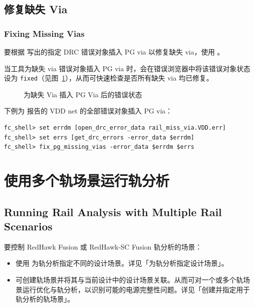 \subsection{修复缺失 Via}
\subsubsection*{Fixing Missing Vias}

要根据  写出的指定 DRC 错误对象插入 PG via 以修复缺失 via，使用 。

当工具为缺失 via 错误对象插入 PG via 时，会在错误浏览器中将该错误对象状态设为 \texttt{fixed}（见图~\ref{fig:fix-via-status}），从而可快速检查是否所有缺失 via 均已修复。

\begin{figure}[htbp]
\centering
{}
\caption{为缺失 Via 插入 PG Via 后的错误状态}
\label{fig:fix-via-status}
\end{figure}

下例为   报告的 VDD net 的全部错误对象插入 PG via：
\begin{lstlisting}
fc_shell> set errdm [open_drc_error_data rail_miss_via.VDD.err]
fc_shell> set errs [get_drc_errors -error_data $errdm]
fc_shell> fix_pg_missing_vias -error_data $errdm $errs
\end{lstlisting}

\section{使用多个轨场景运行轨分析}
\subsection*{Running Rail Analysis with Multiple Rail Scenarios}

要控制 RedHawk Fusion 或 RedHawk-SC Fusion 轨分析的场景：
\begin{itemize}
  \item 使用  为轨分析指定不同的设计场景。详见「为轨分析指定设计场景」。
  \item 可创建轨场景并将其与当前设计中的设计场景关联。从而可对一个或多个轨场景运行优化与轨分析，以识别可能的电源完整性问题。详见「创建并指定用于轨分析的轨场景」。
\end{itemize}


